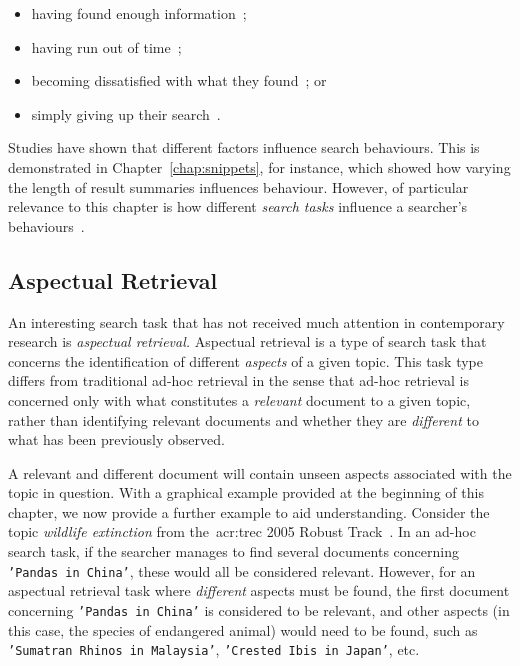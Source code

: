 \begin{itemize}
    \item{having found enough information~\citep{prabha2007enough, dostert2009satisficing, hassan2013beyond_clicks};}
    \item{having run out of time~\citep{zach2005enough_is_enough};}
    \item{becoming dissatisfied with what they found~\citep{kiseleva2015serp_fails}; or}
    \item{simply giving up their search~\citep{diriye2012abandonment}.}
\end{itemize}

Studies have shown that different factors influence search behaviours. This is demonstrated in Chapter~\ref{chap:snippets}, for instance, which showed how varying the length of result summaries influences behaviour. However, of particular relevance to this chapter is how different \emph{search tasks} influence a searcher's behaviours~\citep{kelly2015search_tasks}.

\subsection{Aspectual Retrieval}
An interesting search task that has not received much attention in contemporary research is \emph{aspectual retrieval.} Aspectual retrieval is a type of search task that concerns the identification of different \emph{aspects} of a given topic. This task type differs from traditional ad-hoc retrieval in the sense that ad-hoc retrieval is concerned only with what constitutes a \emph{relevant} document to a given topic, rather than identifying relevant documents and whether they are \emph{different} to what has been previously observed.

A relevant and different document will contain unseen aspects associated with the topic in question. With a graphical example provided at the beginning of this chapter, we now provide a further example to aid understanding. Consider the topic \emph{wildlife extinction} from the~\gls{acr:trec} 2005 Robust Track~\citep{voorhees2006trec_robust}. In an ad-hoc search task, if the searcher manages to find several documents concerning \texttt{'Pandas in China'}, these would all be considered relevant. However, for an aspectual retrieval task where \emph{different} aspects must be found, the first document concerning \texttt{'Pandas in China'} is considered to be relevant, and other aspects (in this case, the species of endangered animal) would need to be found, such as \texttt{'Sumatran Rhinos in Malaysia'}, \texttt{'Crested Ibis in Japan'}, etc.

